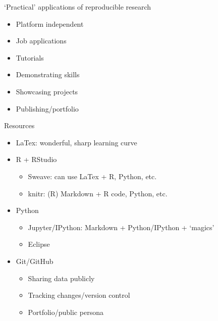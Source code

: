 \documentclass[ignorenonframetext,]{beamer}
\begin{document}
\begin{frame}{`Practical' applications of reproducible research}

\begin{itemize}
\itemsep1pt\parskip0pt
\item
  Platform independent
\item
  Job applications
\item
  Tutorials
\item
  Demonstrating skills
\item
  Showcasing projects
\item
  Publishing/portfolio
\end{itemize}

\end{frame}

\begin{frame}{Resources}

\begin{itemize}
\itemsep1pt\parskip0pt
\item
  LaTex: wonderful, sharp learning curve
\item
  R + RStudio

  \begin{itemize}
  \itemsep1pt\parskip0pt
  \item
    Sweave: can use LaTex + R, Python, etc.\\
  \item
    knitr: (R) Markdown + R code, Python, etc.\\
  \end{itemize}
\item
  Python

  \begin{itemize}
  \itemsep1pt\parskip0pt
  \item
    Jupyter/IPython: Markdown + Python/IPython + `magics'\\
  \item
    Eclipse\\
  \end{itemize}
\item
  Git/GitHub

  \begin{itemize}
  \itemsep1pt\parskip0pt
  \item
    Sharing data publicly
  \item
    Tracking changes/version control\\
  \item
    Portfolio/public persona
  \end{itemize}
\end{itemize}

\end{frame}
\end{document}
